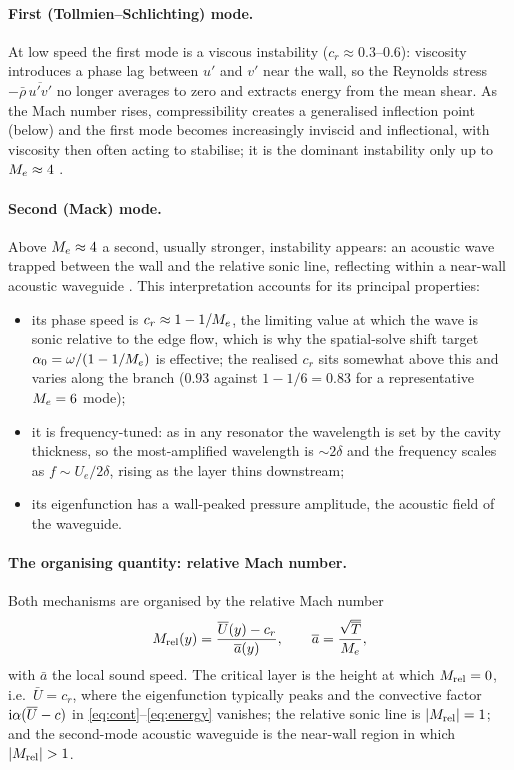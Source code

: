 \documentclass[11pt]{article}
\begin{document}
\paragraph{First (Tollmien--Schlichting) mode.} At low speed the first mode is a viscous instability
($c_r\approx0.3$--$0.6$): viscosity introduces a phase lag between $u'$ and $v'$ near the wall, so the
Reynolds stress $-\bar\rho\,\overline{u'v'}$ no longer averages to zero and extracts energy from the
mean shear. As the Mach number rises, compressibility creates a generalised inflection point (below)
and the first mode becomes increasingly inviscid and inflectional, with viscosity then often acting to
stabilise; it is the dominant instability only up to $M_e\approx4$ \cite{mack1984}.

\paragraph{Second (Mack) mode.} Above $M_e\approx4$ a second, usually stronger, instability appears:
an acoustic wave trapped between the wall and the relative sonic line, reflecting within a near-wall
acoustic waveguide \cite{mack1984,fedorov2011}. This interpretation accounts for its principal
properties:
\begin{itemize}[nosep,leftmargin=1.6em]
  \item its phase speed is $c_r\approx1-1/M_e$, the limiting value at which the wave is sonic relative
        to the edge flow, which is why the spatial-solve shift target $\alpha_0=\omega/(1-1/M_e)$ is
        effective; the realised $c_r$ sits somewhat above this and varies along the branch ($0.93$
        against $1-1/6=0.83$ for a representative $M_e=6$ mode);
  \item it is frequency-tuned: as in any resonator the wavelength is set by the cavity thickness, so
        the most-amplified wavelength is ${\sim}2\delta$ and the frequency scales as
        $f\sim U_e/2\delta$, rising as the layer thins downstream;
  \item its eigenfunction has a wall-peaked pressure amplitude, the acoustic field of the waveguide.
\end{itemize}

\paragraph{The organising quantity: relative Mach number.} Both mechanisms are organised by the
relative Mach number
\begin{equation}\label{eq:mrel}
  M_{\rm rel}(y)=\frac{\overline{U}(y)-c_r}{\overline{a}(y)},\qquad \overline{a}=\frac{\sqrt{\overline{T}}}{M_e},
\end{equation}
with $\bar a$ the local sound speed. The critical layer is the height at which $M_{\rm rel}=0$, i.e.\
$\bar U=c_r$, where the eigenfunction typically peaks and the convective factor
$\mathrm{i}\alpha(\overline{U}-c)$ in \eqref{eq:cont}--\eqref{eq:energy} vanishes; the relative sonic line is
$|M_{\rm rel}|=1$; and the second-mode acoustic waveguide is the near-wall region in which
$|M_{\rm rel}|>1$.
\end{document}
